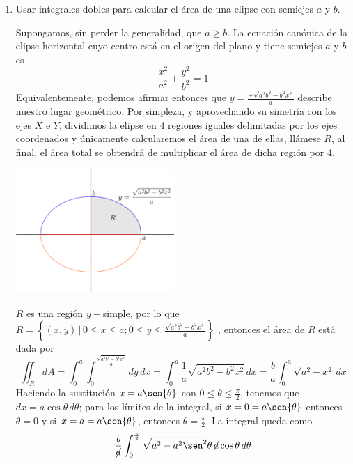\documentclass{article}
\begin{document}
\begin{enumerate}
    \pagebreak
    \item {
        Usar integrales dobles para calcular el área de una elipse con semiejes $a$ y $b$.

        \color{azul}
        Supongamos, sin perder la generalidad, que $a\geq b$. La ecuación canónica de la elipse horizontal
        cuyo centro está en el origen del plano y tiene semiejes $a$ y $b$ es
        \[
            \frac{x^2}{a^2}+\frac{y^2}{b^2}=1
        \]
        Equivalentemente, podemos afirmar entonces que
        \(\displaystyle
            y=\frac{\pm\sqrt{a^2 b^2 -b^2 x^2}}{a}
        \)
        describe nuestro lugar geométrico. Por simpleza, y aprovechando su simetría con los ejes $X$ e $Y$,
        dividimos la elipse en 4 regiones iguales delimitadas por los ejes coordenados y únicamente
        calcularemos el área de una de ellas, llámese $R$, al final, el área total se obtendrá de multiplicar
        el área de dicha región por 4.
        \begin{center}
            \includegraphics[width=6cm]{img/ej4.png}
        \end{center}
        $R$ es una región $y-$simple, por lo que
        \(\displaystyle
            R=\left\{
                (x,y)\,\bigg\vert\,
                0\leq x\leq a;
                0\leq y\leq\frac{\sqrt{a^2b^2-b^2x^2}}{a}
            \right\}
        \)
        , entonces el área de $R$ está dada por
        \[
            \iint_R{dA}
            =\int_0^a{\int_0^{ \frac{\sqrt{a^2b^2-b^2x^2}}{a} }{dy}\,dx}
            =\int_0^a{\frac{1}{a}\sqrt{a^2b^2-b^2x^2}\,dx}
            =\frac{b}{a}\int_0^a{\sqrt{a^2-x^2}\,dx}
        \]
        Haciendo la sustitución $x=a \sen{\theta}$ con $0\leq\theta\leq\frac{\pi}{2}$, tenemos que
        $dx=a\cos{\theta}\,d\theta$; para los límites de la integral, si $x=0=a\sen{\theta}$ entonces
        $\theta=0$ y si $x=a=a\sen{\theta}$, entonces $\theta=\frac{\pi}{2}$. La integral queda como
        \[
            \frac{b}{\cancel{a}}\int_0^{\frac{\pi}{2}}{
                \sqrt{a^2-a^2\sen^2{\theta}}\,\cancel{a}\cos{\theta}\,d\theta
}\]}
\end{enumerate}
\end{document}
